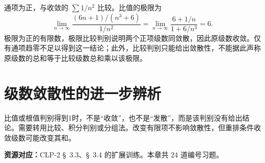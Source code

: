 \documentclass[UTF8,12pt,a4paper,fontset=fandol]{ctexart}
\begin{document}
\begin{solve}\label{ans:c24q24}
通项为正，与收敛的 $\sum1/n^2$ 比较。比值的极限为
\[
\lim_{n\to\infty}\frac{(6n+1)/(n^3+6)}{1/n^2}=\lim_{n\to\infty}\frac{6+1/n}{1+6/n^3}=6.
\]
极限为正的有限数，极限比较判别说明两个正项级数同敛散，因此原级数收敛。仅有通项趋零不足以得到这一结论；此外，比较判别只能给出敛散性，不能据此声称原级数的总和等于比较级数总和乘以该极限。
\end{solve}

\clearpage
\section{级数敛散性的进一步辨析}\label{sec:ch25}
比值或根值判别得到1时，不是“收敛”，也不是“发散”，而是该判别没有给出结论。需要转用比较、积分判别或分组法。改变有限项不影响敛散性，但重排条件收敛级数可能改变其和。

\textbf{资源对应：}CLP-2 \S~3.3、\S~3.4 的扩展训练。本章共 24 道编号习题。
\end{document}
